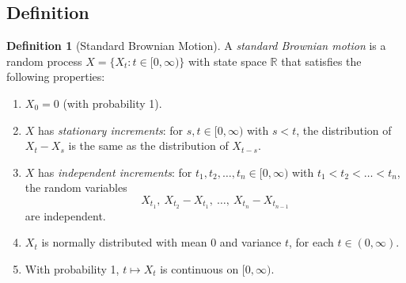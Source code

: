 \documentclass[12pt,openany]{book}
\theoremstyle{definition}
\newtheorem{definition}[theorem]{Definition}
\theoremstyle{remark}
\newcommand{\R}{\mathbb{R}}
\begin{document}
\subsection{Definition}
 
\begin{definition}[Standard Brownian Motion]
A \emph{standard Brownian motion} is a random process $X = \{X_t : t \in [0,\infty)\}$ with state space $\R$ that satisfies the following properties:
\begin{enumerate}[label=(\arabic*)]
    \item $X_0 = 0$ (with probability 1).
    \item $X$ has \emph{stationary increments}: for $s,t \in [0,\infty)$ with $s<t$, the distribution of $X_t - X_s$ is the same as the distribution of $X_{t-s}$.
    \item $X$ has \emph{independent increments}: for $t_1,t_2,\dots,t_n \in [0,\infty)$ with $t_1 < t_2 < \dots < t_n$, the random variables
    \[
        X_{t_1},\ X_{t_2}-X_{t_1},\ \dots,\ X_{t_n} - X_{t_{n-1}}
    \]
    are independent.
    \item $X_t$ is normally distributed with mean $0$ and variance $t$, for each $t \in (0,\infty)$.
    \item With probability 1, $t \mapsto X_t$ is continuous on $[0,\infty)$.
\end{enumerate}
\end{definition}
 
\end{document}
